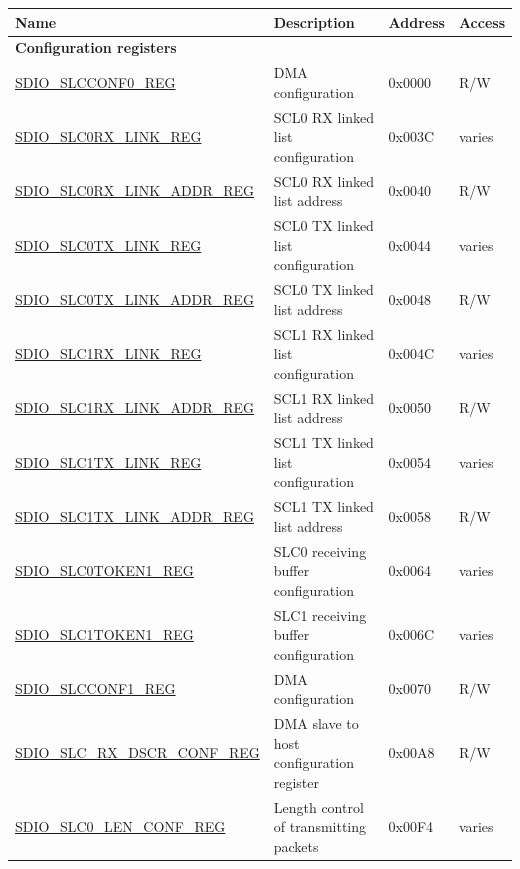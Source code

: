 \begin{longtable}{ | p{7.1cm} | p{6.1cm} | p{1.2cm} | p{1cm} | }
\hline\rowcolor{lightgray}
Name & Description &  Address & Access \\ \hline
\endhead
\multicolumn{4}{|l|}{\textbf{Configuration registers}} \\ \hline
\hyperref[regdesc:SDIOSLCCONF0REG]{SDIO\_SLCCONF0\_REG} & DMA configuration & 0x0000 & R/W \\ \hline
\hyperref[regdesc:SDIOSLC0RXLINKREG]{SDIO\_SLC0RX\_LINK\_REG} & SCL0 RX linked list configuration & 0x003C & varies \\ \hline
\hyperref[regdesc:SDIOSLC0RXLINKADDRREG]{SDIO\_SLC0RX\_LINK\_ADDR\_REG} & SCL0 RX linked list address & 0x0040 & R/W \\ \hline
\hyperref[regdesc:SDIOSLC0TXLINKREG]{SDIO\_SLC0TX\_LINK\_REG} & SCL0 TX linked list configuration & 0x0044 & varies \\ \hline
\hyperref[regdesc:SDIOSLC0TXLINKADDRREG]{SDIO\_SLC0TX\_LINK\_ADDR\_REG} & SCL0 TX linked list address & 0x0048 & R/W \\ \hline
\hyperref[regdesc:SDIOSLC1RXLINKREG]{SDIO\_SLC1RX\_LINK\_REG} & SCL1 RX linked list configuration  & 0x004C & varies \\ \hline
\hyperref[regdesc:SDIOSLC1RXLINKADDRREG]{SDIO\_SLC1RX\_LINK\_ADDR\_REG} & SCL1 RX linked list address & 0x0050 & R/W \\ \hline
\hyperref[regdesc:SDIOSLC1TXLINKREG]{SDIO\_SLC1TX\_LINK\_REG} & SCL1 TX linked list configuration & 0x0054 & varies \\ \hline
\hyperref[regdesc:SDIOSLC1TXLINKADDRREG]{SDIO\_SLC1TX\_LINK\_ADDR\_REG} & SCL1 TX linked list address & 0x0058 & R/W \\ \hline
\hyperref[regdesc:SDIOSLC0TOKEN1REG]{SDIO\_SLC0TOKEN1\_REG} & SLC0 receiving buffer configuration & 0x0064 & varies \\ \hline
\hyperref[regdesc:SDIOSLC1TOKEN1REG]{SDIO\_SLC1TOKEN1\_REG} & SLC1 receiving buffer configuration & 0x006C & varies \\ \hline
\hyperref[regdesc:SDIOSLCCONF1REG]{SDIO\_SLCCONF1\_REG} & DMA configuration & 0x0070 & R/W \\ \hline
\hyperref[regdesc:SDIOSLCRXDSCRCONFREG]{SDIO\_SLC\_RX\_DSCR\_CONF\_REG} & DMA slave to host configuration register & 0x00A8 & R/W \\ \hline
\hyperref[regdesc:SDIOSLC0LENCONFREG]{SDIO\_SLC0\_LEN\_CONF\_REG} & Length control of transmitting packets & 0x00F4 & varies \\ \hline

\end{longtable}
